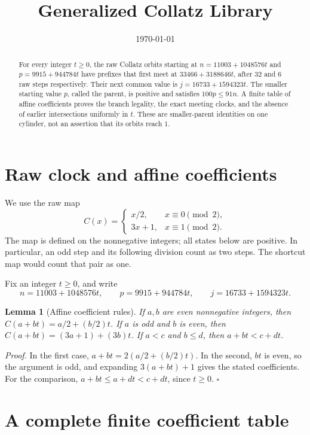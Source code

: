 \documentclass[11pt,letterpaper]{article}
\title{Generalized Collatz Library}
\author{}
\date{\today}
\newtheorem{lemma}[theorem]{Lemma}
\newenvironment{proof}{\noindent\textit{Proof.}}{\hfill\(\square\)}
\begin{document}
\maketitle

\begin{abstract}
For every integer \(t\ge0\), the raw Collatz orbits starting at
\(n=11003+1048576t\) and \(p=9915+944784t\) have prefixes that first meet at
\(33466+3188646t\), after \(32\) and \(6\) raw steps respectively.
Their next common value is \(j=16733+1594323t\).
The smaller starting value \(p\), called the parent, is positive and
satisfies \(100p\le91n\).
A finite table of affine coefficients proves the branch legality,
the exact meeting clocks, and the absence of earlier intersections
uniformly in \(t\). These are smaller-parent identities on one cylinder,
not an assertion that its orbits reach \(1\).
\end{abstract}

\section{Raw clock and affine coefficients}

We use the raw map
\[
C(x)=
\begin{cases}
x/2,&x\equiv0\pmod2,\\
3x+1,&x\equiv1\pmod2.
\end{cases}
\]
The map is defined on the nonnegative integers; all states below are positive.
In particular, an odd step and its following division count as two steps.
The shortcut map would count that pair as one.

Fix an integer \(t\ge0\), and write
\[
n=11003+1048576t,\qquad p=9915+944784t,\qquad
j=16733+1594323t.
\]

\begin{lemma}[Affine coefficient rules]
\label{lem:coefficients}
If \(a,b\) are even nonnegative integers, then
\(C(a+bt)=a/2+(b/2)t\).
If \(a\) is odd and \(b\) is even, then
\(C(a+bt)=(3a+1)+(3b)t\).
If \(a<c\) and \(b\le d\), then \(a+bt<c+dt\).
\end{lemma}

\begin{proof}
In the first case, \(a+bt=2(a/2+(b/2)t)\).
In the second, \(bt\) is even, so the argument is odd, and expanding
\(3(a+bt)+1\) gives the stated coefficients.
For the comparison,
\(a+bt\le a+dt<c+dt\), since \(t\ge0\).
\end{proof}

\section{A complete finite coefficient table}
\end{document}
